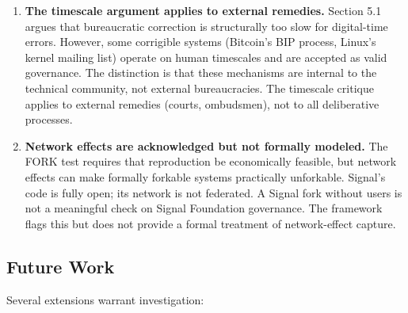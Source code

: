 \documentclass{article}
\begin{document}
\begin{enumerate}
    \item \textbf{The timescale argument applies to external remedies.} Section 5.1 argues that bureaucratic correction is structurally too slow for digital-time errors. However, some corrigible systems (Bitcoin's BIP process, Linux's kernel mailing list) operate on human timescales and are accepted as valid governance. The distinction is that these mechanisms are internal to the technical community, not external bureaucracies. The timescale critique applies to external remedies (courts, ombudsmen), not to all deliberative processes.

    \item \textbf{Network effects are acknowledged but not formally modeled.} The FORK test requires that reproduction be economically feasible, but network effects can make formally forkable systems practically unforkable. Signal's code is fully open; its network is not federated. A Signal fork without users is not a meaningful check on Signal Foundation governance. The framework flags this but does not provide a formal treatment of network-effect capture.
\end{enumerate}

\subsection{Future Work}

Several extensions warrant investigation:
\end{document}
